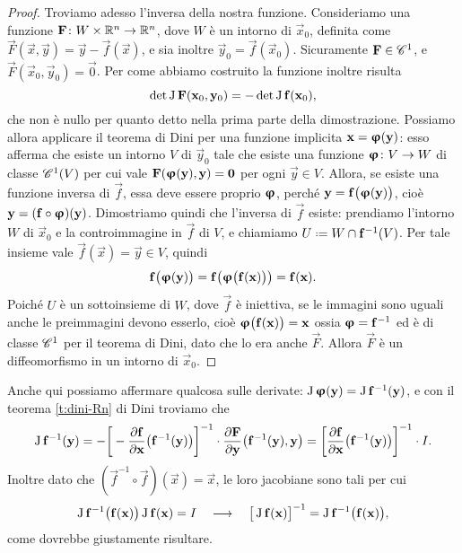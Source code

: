 \begin{proof}
	Troviamo adesso l'inversa della nostra funzione.
	Consideriamo una funzione $\vec F\colon W\times\R^n\to\R^n$, dove $W$ è un intorno di $\vec x_0$, definita come $\vec F(\vec x,\vec y)=\vec y-\vec f(\vec x)$, e sia inoltre $\vec y_0=\vec f(\vec x_0)$.
	Sicuramente $\vec F\in\cclass[1]$, e $\vec F(\vec x_0,\vec y_0)=\vec 0$.
	Per come abbiamo costruito la funzione inoltre risulta
	\begin{equation}
		\det\jac\vec F(\vec x_0,\vec y_0)=-\det\jac\vec f(\vec x_0),
	\end{equation}
	che non è nullo per quanto detto nella prima parte della dimostrazione.
	Possiamo allora applicare il teorema di Dini per una funzione implicita $\vec x=\vphi(\vec y)$: esso afferma che esiste un intorno $V$ di $\vec y_0$ tale che esiste una funzione $\vphi\colon V\to W$ di classe $\cont[1]{V}$ per cui vale $\vec F(\vphi(\vec y),\vec y)=\vec 0$ per ogni $\vec y\in V$.
	Allora, se esiste una funzione inversa di $\vec f$, essa deve essere proprio $\vphi$, perch\'e $\vec y=\vec f\big(\vphi(\vec y)\big)$, cioè $\vec y=(\vec f\circ \vphi)(\vec y)$.
	Dimostriamo quindi che l'inversa di $\vec f$ esiste: prendiamo l'intorno $W$ di $\vec x_0$ e la controimmagine in $\vec f$ di $V$, e chiamiamo $U\defeq W\cap\vec f^{-1}(V)$.
	Per tale insieme vale $\vec f(\vec x)=\vec y\in V$, quindi
	\begin{equation*}
		\vec f\big(\vphi(\vec y)\big)=\vec f\big(\vphi\big(\vec f(\vec x)\big)\big)=\vec f(\vec x).
	\end{equation*}
	Poiché $U$ è un sottoinsieme di $W$, dove $\vec f$ è iniettiva, se le immagini sono uguali anche le preimmagini devono esserlo, cioè $\vphi\big(\vec f(\vec x)\big)=\vec x$ ossia $\vphi=\vec f^{-1}$ ed è di classe $\cclass[1]$ per il teorema di Dini, dato che lo era anche $\vec F$.
	Allora $\vec F$ è un diffeomorfismo in un intorno di $\vec x_0$.
\end{proof}
Anche qui possiamo affermare qualcosa sulle derivate: $\jac\vphi(\vec y)=\jac\vec f^{-1}(\vec y)$, e con il teorema \ref{t:dini-Rn} di Dini troviamo che
\begin{equation}
	\jac\vec f^{-1}(\vec y)=-\bigg[-\drp{\vec f}{\vec x}\big(\vec f^{-1}(\vec y)\big)\bigg]^{-1}\cdot\drp{\vec F}{\vec y}\big(\vec f^{-1}(\vec y),\vec y\big)
	=\bigg[\drp{\vec f}{\vec x}\big(\vec f^{-1}(\vec y)\big)\bigg]^{-1}\cdot I.
\end{equation}
Inoltre dato che $(\vec f^{-1}\circ\vec f)(\vec x)=\vec x$, le loro jacobiane sono tali per cui
\begin{equation*}
	\jac\vec f^{-1}\big(\vec f(\vec x)\big)\jac\vec f(\vec x)=I\qqq \big[\jac\vec f(\vec x)\big]^{-1}=\jac\vec f^{-1}\big(\vec f(\vec x)\big),
\end{equation*}
come dovrebbe giustamente risultare.

